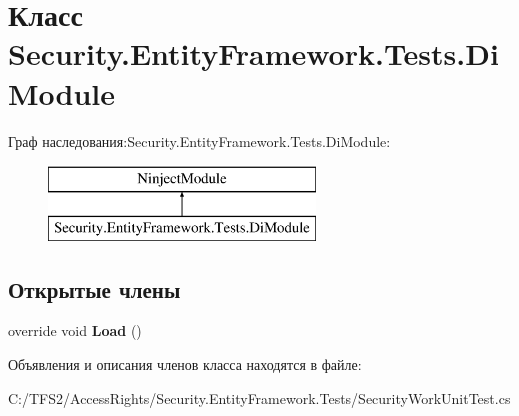 \hypertarget{class_security_1_1_entity_framework_1_1_tests_1_1_di_module}{}\section{Класс Security.\+Entity\+Framework.\+Tests.\+Di\+Module}
\label{class_security_1_1_entity_framework_1_1_tests_1_1_di_module}
Граф наследования\+:Security.\+Entity\+Framework.\+Tests.\+Di\+Module\+:\begin{figure}[H]
\begin{center}
\leavevmode
\includegraphics[height=2.000000cm]{da/dce/class_security_1_1_entity_framework_1_1_tests_1_1_di_module}
\end{center}
\end{figure}
\subsection*{Открытые члены}
\begin{DoxyCompactItemize}
\item 
\mbox{\label{class_security_1_1_entity_framework_1_1_tests_1_1_di_module_a49d1cefae510d4b75fb333874c68c951}} 
override void {\bfseries Load} ()
\end{DoxyCompactItemize}


Объявления и описания членов класса находятся в файле\+:\begin{DoxyCompactItemize}
\item 
C\+:/\+T\+F\+S2/\+Access\+Rights/\+Security.\+Entity\+Framework.\+Tests/Security\+Work\+Unit\+Test.\+cs\end{DoxyCompactItemize}

